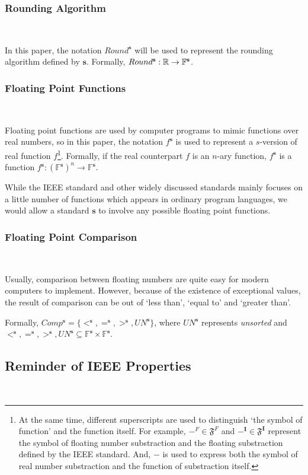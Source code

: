 \documentclass[12pt]{article}
\newcommand{\F}{\mathbb{F}}
\newcommand{\s}{\mathbf{s}}
\begin{document}
\subsubsection{Rounding Algorithm} \

In this paper, the notation $Round^\s$ will be used to represent the rounding algorithm defined by $\s$. Formally, $Round^\s : \R \to \F^\s$.

\subsubsection{Floating Point Functions} \

Floating point functions are used by computer programs to mimic functions over real numbers, so in this paper, the notation $f^\mathbf{s}$ is used to represent a $s$-version of real function $f$\footnote{At the same time, different superscripts are used to distinguish `the symbol of function' and the function itself. For example, $-^F \in \mathfrak{F}^F$ and $-^\mathbf{I}\in \mathfrak{F}^\mathbf{I}$ represent the symbol of floating number substraction and the floating substraction defined by the IEEE standard. And, $-$ is used to express both the symbol of real number substraction and the function of  substraction itself.}. Formally, if the real counterpart $f$ is an $n$-ary function, $f^\mathbf{s}$ is a function $f^\mathbf{s} : \left(\F^\s\right)^n \to \F^\s$.

While the IEEE standard and other widely discussed standards mainly focuses on a little number of functions which appears in ordinary program languages, we would allow a standard $\mathbf{s}$ to involve any possible floating point functions.

\subsubsection{Floating Point Comparison} \

Usually, comparison between floating numbers are quite easy for modern computers to implement. However, because of the existence of exceptional values, the result of comparison can be out of `less than', `equal to' and `greater than'.

Formally, $Comp^\s = \{<^\s, =^\s, >^\s, UN^\s\}$, where $UN^\s$ represents \emph{unsorted} and $<^\s, =^\s, >^\s, UN^\s \subseteq \F^\s \times \F^\s$.

\subsection{Reminder of IEEE Properties} \
\end{document}
